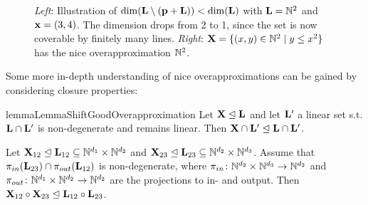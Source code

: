 \begin{figure}[h!]
\begin{minipage}{4.5cm}
\end{minipage}%

\caption{\textit{Left}: Illustration of \(\dim(\mathbf{L} \setminus (\mathbf{p}+\mathbf{L}))<\dim(\mathbf{L})\) with \(\mathbf{L}=\mathbb{N}^2\) and \(\mathbf{x}=(3,4)\). The dimension drops from 2 to 1, since the set is now coverable by finitely many lines.  \newline
\textit{Right}: \(\mathbf{X}=\{(x,y)\in \mathbb{N}^2 \mid y \leq x^2\}\) has the nice overapproximation \(\mathbb{N}^2\).}\label{FigureIntuitionSemilinearityAlgorithm}
\end{figure}

Some more in-depth understanding of nice overapproximations can be gained by considering closure properties:

\begin{restatable}{lemma}{LemmaShiftGoodOverapproximation} \label{LemmaShiftGoodOverapproximation}
Let \(\mathbf{X} \trianglelefteq \mathbf{L}\) and let \(\mathbf{L}'\) a linear set s.t. \(\mathbf{L} \cap \mathbf{L}'\) is non-degenerate and remains linear. Then \(\mathbf{X} \cap \mathbf{L}' \trianglelefteq \mathbf{L} \cap \mathbf{L}'\).

Let \(\mathbf{X}_{12} \trianglelefteq \mathbf{L}_{12} \subseteq \mathbb{N}^{d_1} \times \mathbb{N}^{d_2}\) and \(\mathbf{X}_{23} \trianglelefteq \mathbf{L}_{23}\subseteq \mathbb{N}^{d_2} \times \mathbb{N}^{d_3}\). Assume that \(\pi_{in}(\mathbf{L}_{23}) \cap \pi_{out}(\mathbf{L}_{12})\) is non-degenerate, where \(\pi_{in} \colon \mathbb{N}^{d_2} \times \mathbb{N}^{d_3} \to \mathbb{N}^{d_2}\) and \(\pi_{out} \colon \mathbb{N}^{d_1} \times \mathbb{N}^{d_2} \to \mathbb{N}^{d_2}\) are the projections to in- and output. Then \(\mathbf{X}_{12} \circ \mathbf{X}_{23} \trianglelefteq \mathbf{L}_{12} \circ \mathbf{L}_{23}\).
\end{restatable}

